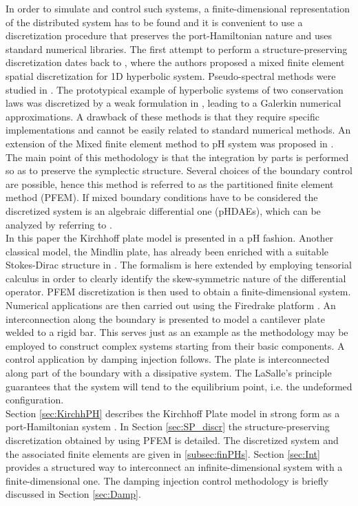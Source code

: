 \documentclass[letterpaper, 10 pt, conference]{ieeeconf}
\begin{document}
In order to simulate and control such systems, a finite-dimensional representation of the distributed system has to be found and it is convenient to use a discretization procedure that preserves the port-Hamiltonian nature and uses standard numerical libraries. The first attempt to perform a structure-preserving discretization dates back to \cite{Golo}, where the authors proposed a mixed finite element spatial discretization for 1D hyperbolic system. Pseudo-spectral methods were studied in \cite{moulla:hal-01625008}. The prototypical example of hyperbolic systems of two conservation laws was discretized by a weak formulation in \cite{WeakForm_Kot}, leading to a Galerkin numerical approximations. A drawback of these methods is that they require specific implementations and cannot be easily related to standard numerical methods. An extension of the Mixed finite element method to pH system was proposed in \cite{CardosoRibeiro2018}. The main point of this methodology is that the integration by parts is performed so as to preserve the symplectic structure. Several choices of the boundary control are possible, hence this method is referred to as the partitioned finite element method (PFEM). If mixed boundary conditions have to be considered the discretized system is an algebraic differential one (pHDAEs), which can be analyzed by referring to \cite{beattie2018linear}. \\

In this paper the Kirchhoff plate model is presented in a pH fashion. Another classical model, the Mindlin plate, has already been enriched with a suitable Stokes-Dirac structure in \cite{MacchelliMindlin}. The formalism is here extended by employing  tensorial calculus in order to clearly identify the skew-symmetric nature of the differential operator. PFEM discretization is then used to obtain a finite-dimensional system. Numerical applications are then carried out using the Firedrake platform \cite{firedrake}. An interconnection along the boundary is presented to model a cantilever plate welded to a rigid bar. This serves just as an example as the methodology may be employed to construct complex systems starting from their basic components. A control application by damping injection follows. The plate is interconnected along part of the boundary with a dissipative system. The LaSalle's principle guarantees that the system will tend to the equilibrium point, i.e. the undeformed configuration. \\

Section \ref{sec:KirchhPH} describes the Kirchhoff Plate model in strong form as a port-Hamiltonian system . In Section \ref{sec:SP_discr} the structure-preserving discretization obtained by using PFEM  is detailed. The discretized system and the associated finite elements are given in \ref{subsec:finPHs}. Section \ref{sec:Int} provides a structured way to interconnect an infinite-dimensional system with a finite-dimensional one. The damping injection control methodology is briefly discussed in Section \ref{sec:Damp}. 
\end{document}
